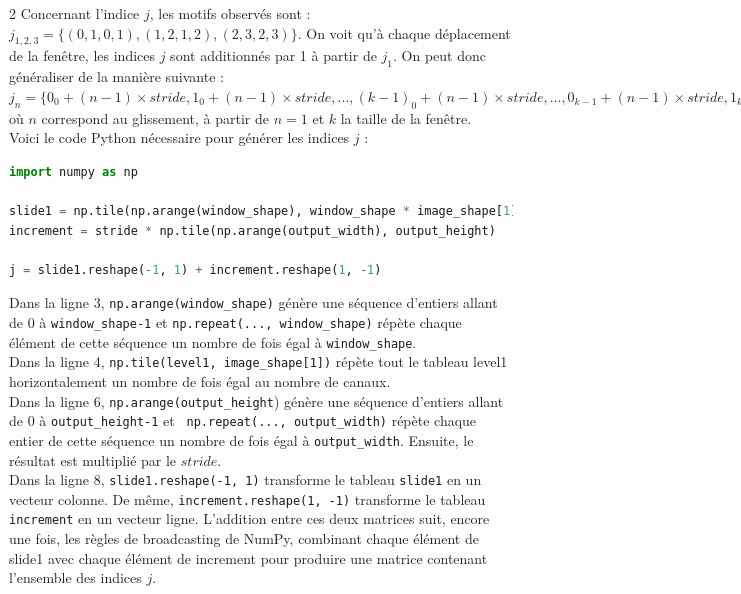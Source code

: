 \begin{multicols}{2}
Concernant l’indice $j$, les motifs observés sont : 
$j_{1,2,3} = \{(0,1,0,1),(1,2,1,2),(2,3,2,3)\}$. On voit qu'à chaque déplacement 
de la fenêtre, les indices $j$ sont additionnés par 1 à partir de $j_{1}$. On peut donc généraliser
de la manière suivante : \\

$j_{n} = \{0_{0}+(n-1) \times stride,1_{0}+(n-1)\times stride,...,(k-1)_{0}+(n-1)\times stride,...,0_{k-1}+(n-1)\times stride,1_{k-1}+(n-1)\times stride,...,(k-1)_{k-1}+(n-1)\times stride\}$\\
où $n$ correspond au glissement, à partir de $n=1$ et $k$ la taille de la fenêtre. \\

Voici le code Python nécessaire pour générer les indices $j$ : \\

\begin{lstlisting}[language=Python]
import numpy as np

slide1 = np.tile(np.arange(window_shape), window_shape * image_shape[1])
increment = stride * np.tile(np.arange(output_width), output_height)

j = slide1.reshape(-1, 1) + increment.reshape(1, -1)
\end{lstlisting}
\hfill\break

Dans la ligne 3, \texttt{np.arange(window\_shape)} génère une séquence d’entiers allant
de 0 à \texttt{window\_shape-1} et \texttt{np.repeat(..., window\_shape)} répète chaque élément
de cette séquence un nombre de fois égal à \texttt{window\_shape}. \\

Dans la ligne 4, \texttt{np.tile(level1, image\_shape[1])} répète tout le tableau
level1 horizontalement un nombre de fois égal au nombre de canaux. \\

Dans la ligne 6, \texttt{np.arange(output\_height}) génère une séquence d’entiers allant
de 0 à \texttt{output\_height-1} et \texttt{ np.repeat(..., output\_width)} répète chaque entier
de cette séquence un nombre de fois égal à \texttt{output\_width}. Ensuite, le résultat
est multiplié par le $stride$. \\

Dans la ligne 8, \texttt{slide1.reshape(-1, 1)} transforme le tableau \texttt{slide1} en un
vecteur colonne. De même, \texttt{increment.reshape(1, -1)} transforme le tableau \texttt{increment} en un vecteur
ligne. L’addition entre ces deux matrices suit, encore une fois, les règles de broadcasting de NumPy\cite{NumPyEfficiency},
combinant chaque élément de slide1 avec chaque élément de increment pour produire
une matrice contenant l’ensemble des indices $j$. \\


\end{multicols}
